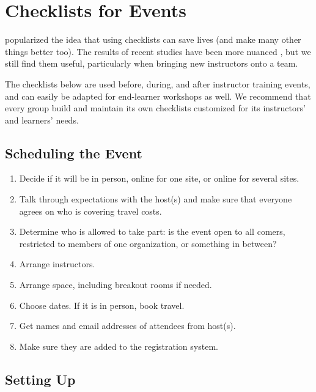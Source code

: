 \chapter{Checklists for Events}\label{s:events}

\cite{Gawa2007} popularized the idea that using checklists can save
lives (and make many other things better too). The results of recent
studies have been more nuanced \cite{Avel2013,Urba2014}, but we still
find them useful, particularly when bringing new instructors onto a
team.

The checklists below are used before, during, and after instructor
training events, and can easily be adapted for end-learner workshops as
well. We recommend that every group build and maintain its own
checklists customized for its instructors' and learners' needs.

\section{Scheduling the Event}\label{scheduling-the-event}

\begin{enumerate}
\item
  Decide if it will be in person, online for one site, or online for
  several sites.
\item
  Talk through expectations with the host(s) and make sure that
  everyone agrees on who is covering travel costs.
\item
  Determine who is allowed to take part: is the event open to all
  comers, restricted to members of one organization, or something in
  between?
\item
  Arrange instructors.
\item
  Arrange space, including breakout rooms if needed.
\item
  Choose dates. If it is in person, book travel.
\item
  Get names and email addresses of attendees from host(s).
\item
  Make sure they are added to the registration system.
\end{enumerate}

\section{Setting Up}\label{setting-up}

